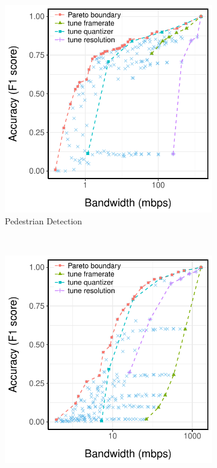 \begin{figure}
  \centering
  \begin{subfigure}[t]{0.30\textwidth}
    \centering
    \includegraphics[width=\textwidth]{figures/ped-profile.pdf}
    \caption{Pedestrian Detection}
    \label{fig:pd-profile}
  \end{subfigure}
  ~
  \begin{subfigure}[t]{0.30\textwidth}
    \centering
    \includegraphics[width=\textwidth]{figures/darknet-profile.pdf}

\end{subfigure}
\end{figure}
